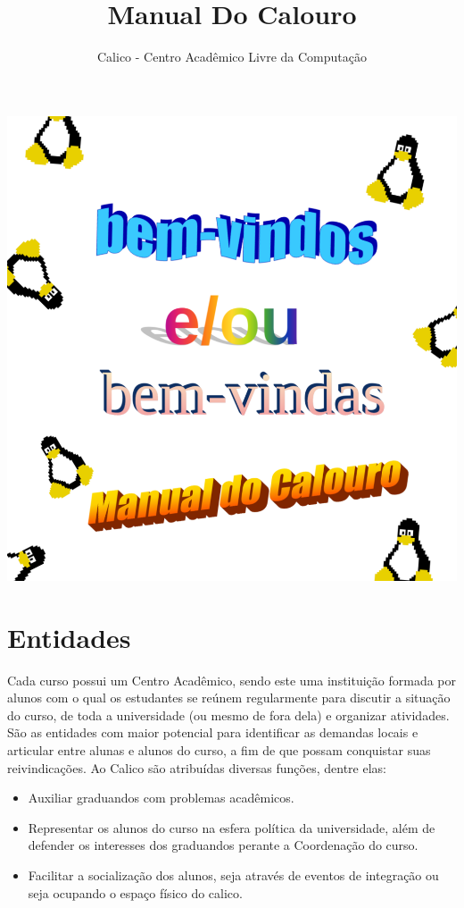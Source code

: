 \documentclass{article}
\title{Manual Do Calouro}
\author{Calico - Centro Acadêmico Livre da Computação}
\begin{document}
    \vspace{5cm}
    \includegraphics[width=\paperwidth,height=\paperheight]{capa}
\restoregeometry

\maketitle
\tableofcontents

\clearpage

\section{Entidades} 
Cada curso possui um Centro Acadêmico, sendo este uma instituição formada por alunos com o qual os estudantes se reúnem regularmente para discutir a situação do curso, de toda a universidade (ou mesmo de fora dela) e organizar atividades. São as entidades com maior potencial para identificar as demandas locais e articular entre alunas e alunos do curso, a fim de que possam conquistar suas reivindicações.
Ao Calico são atribuídas diversas funções, dentre elas:
\begin{itemize}
\item Auxiliar graduandos com problemas acadêmicos.
\item Representar os alunos do curso na esfera política da universidade, além de defender os interesses dos graduandos perante a Coordenação do curso.
\item Facilitar a socialização dos alunos, seja através de eventos de integração ou seja ocupando o espaço físico do calico.
\end{itemize}
 
\end{document}
